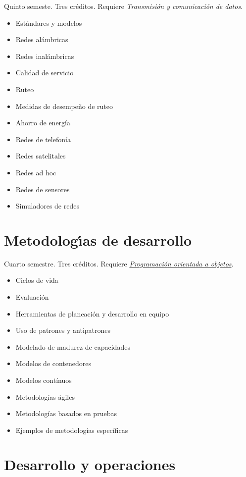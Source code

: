 \documentclass{article}
\begin{document}
\begin{multicols}{4}
Quinto semeste. Tres cr\'{e}ditos. Requiere {\em Transmisi\'{o}n y
  comunicaci\'{o}n de datos}.

\begin{itemize}
\item{Est\'{a}ndares y modelos}
\item{Redes al\'{a}mbricas}
\item{Redes inal\'{a}mbricas}
\item{Calidad de servicio}
\item{Ruteo}
\item{Medidas de desempe\~{n}o de ruteo}  
\item{Ahorro de energ\'{i}a}
\item{Redes de telefon\'{i}a}
\item{Redes satelitales}
\item{Redes ad hoc}
\item{Redes de sensores}
\item{Simuladores de redes}
\end{itemize}

\vfill\null \columnbreak

\hypertarget{mdd}{\section*{Metodolog\'{\i}as de desarrollo}}

Cuarto semestre. Tres cr\'{e}ditos. Requiere \hyperlink{poao}{\em
  Programaci\'{o}n orientada a objetos}.

\begin{itemize}
\item{Ciclos de vida}
\item{Evaluaci\'{o}n}
\item{Herramientas de planeaci\'{o}n y desarrollo en equipo}
\item{Uso de patrones y antipatrones}
\item{Modelado de madurez de capacidades}
\item{Modelos de contenedores}
\item{Modelos cont\'{i}nuos}
\item{Metodolog\'{i}as \'{a}giles}
\item{Metodolog\'{i}as basados en pruebas}  
\item{Ejemplos de metodolog\'{i}as espec\'{i}ficas}
\end{itemize}

\vfill\null \columnbreak

\hypertarget{dyo}{\section*{Desarrollo y operaciones}} 


\end{multicols}
\end{document}
